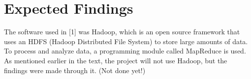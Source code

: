 \section{Expected Findings}
The software used in [1] was Hadoop, which is an open source framework that uses an HDFS (Hadoop Distributed File System) to store large amounts of data. To process and analyze data, a programming module called MapReduce is used.  As mentioned earlier in the text, the project will not use Hadoop, but the findings were made through it. (Not done yet!)